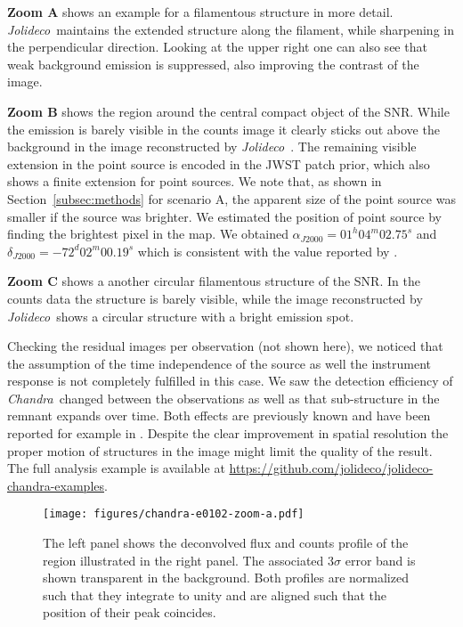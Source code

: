 \documentclass[twocolumn]{aastex631}
\newcommand{\chandra}{\textit{Chandra}~}
\newcommand{\jolideco}{\textit{Jolideco}~}
\begin{document}
    \textbf{Zoom A} shows an example for a filamentous structure in more detail. \jolideco maintains the extended structure along the filament, while sharpening in the perpendicular direction. Looking at the upper right one can also see that weak background emission is suppressed, also improving the contrast of the image.
    
    \textbf{Zoom B} shows the region around the central compact object of the SNR. While the emission is barely visible in the counts image it clearly sticks out above the background in the image reconstructed by \jolideco. The remaining visible extension in the point source is encoded in the JWST patch prior, which also shows a finite extension for point sources. We note that, as shown in Section~\ref{subsec:methods} for scenario A, the apparent size of the point source was smaller if the source was brighter. We estimated the position of point source by finding the brightest pixel in the map. We obtained $\alpha_{J2000}=01^h04^m02.75^s$ and $\delta_{J2000}=-72^d02^m00.19^s$ which is consistent with the value reported by \cite{Long2020}.
    
    \textbf{Zoom C} shows a another circular filamentous structure of the SNR. In the counts data the structure is barely visible, while the image reconstructed by \jolideco shows a circular structure with a bright emission spot. 

    Checking the residual images per observation (not shown here), we noticed that the assumption of the time independence of the source as well the instrument response is not completely fulfilled in this case. We saw the detection efficiency of \chandra changed between the observations as well as that sub-structure in the remnant expands over time. Both effects are previously known and have been reported for example in \cite{Xi2019}. Despite the clear improvement in spatial resolution the proper motion of structures in the image might limit the quality of the result. The full analysis example is available at \url{https://github.com/jolideco/jolideco-chandra-examples}.

    \begin{figure*}
        \begin{centering}
            \texttt{[image: figures/chandra-e0102-zoom-a.pdf]}
            \caption{
                The left panel shows the deconvolved flux and counts profile of the region illustrated in the right panel. The associated $3\sigma$ error band is shown transparent in the background. Both profiles are normalized such that they integrate to unity and are aligned such that the position of their peak coincides.
            }
            \label{fig:chandra-e0102-zoom-a}
        \end{centering}
    \end{figure*}
    
\end{document}
